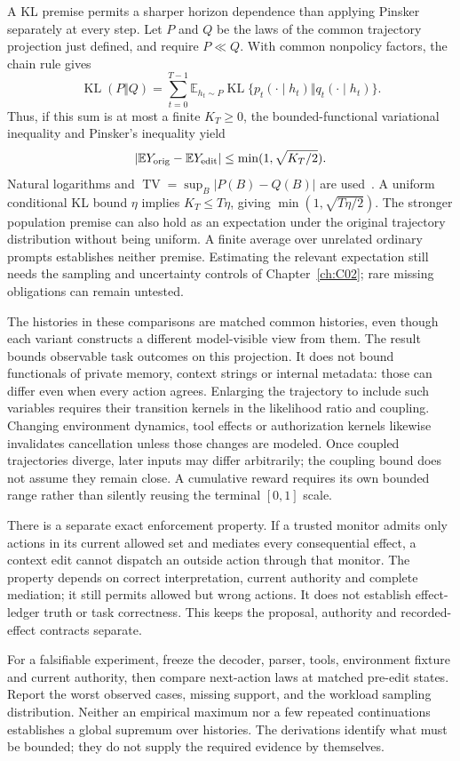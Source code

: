 A KL premise permits a sharper horizon dependence than applying Pinsker separately at every step. Let $P$ and $Q$ be the laws of the common trajectory projection just defined, and require $P\ll Q$. With common nonpolicy factors, the chain rule gives
\begin{equation}
 \operatorname{KL}(P\Vert Q)=
 \sum_{t=0}^{T-1}\mathbb E_{h_t\sim P}
 \operatorname{KL}\{p_t(\cdot\mid h_t)\Vert q_t(\cdot\mid h_t)\}.
\end{equation}
Thus, if this sum is at most a finite $K_T\geq0$, the bounded-functional variational inequality and Pinsker's inequality yield
\begin{equation}
 |\mathbb EY_{\rm orig}-\mathbb EY_{\rm edit}|
 \leq\min(1,\sqrt{K_T/2}).
\end{equation}
Natural logarithms and $\operatorname{TV}=\sup_B|P(B)-Q(B)|$ are used~\cite{ch02_reid2011}. A uniform conditional KL bound $\eta$ implies $K_T\leq T\eta$, giving $\min(1,\sqrt{T\eta/2})$. The stronger population premise can also hold as an expectation under the original trajectory distribution without being uniform. A finite average over unrelated ordinary prompts establishes neither premise. Estimating the relevant expectation still needs the sampling and uncertainty controls of Chapter~\ref{ch:C02}; rare missing obligations can remain untested.

The histories in these comparisons are matched common histories, even though each variant constructs a different model-visible view from them. The result bounds observable task outcomes on this projection. It does not bound functionals of private memory, context strings or internal metadata: those can differ even when every action agrees. Enlarging the trajectory to include such variables requires their transition kernels in the likelihood ratio and coupling. Changing environment dynamics, tool effects or authorization kernels likewise invalidates cancellation unless those changes are modeled. Once coupled trajectories diverge, later inputs may differ arbitrarily; the coupling bound does not assume they remain close. A cumulative reward requires its own bounded range rather than silently reusing the terminal $[0,1]$ scale.

There is a separate exact enforcement property. If a trusted monitor admits only actions in its current allowed set and mediates every consequential effect, a context edit cannot dispatch an outside action through that monitor. The property depends on correct interpretation, current authority and complete mediation; it still permits allowed but wrong actions. It does not establish effect-ledger truth or task correctness. This keeps the proposal, authority and recorded-effect contracts separate.

For a falsifiable experiment, freeze the decoder, parser, tools, environment fixture and current authority, then compare next-action laws at matched pre-edit states. Report the worst observed cases, missing support, and the workload sampling distribution. Neither an empirical maximum nor a few repeated continuations establishes a global supremum over histories. The derivations identify what must be bounded; they do not supply the required evidence by themselves.
